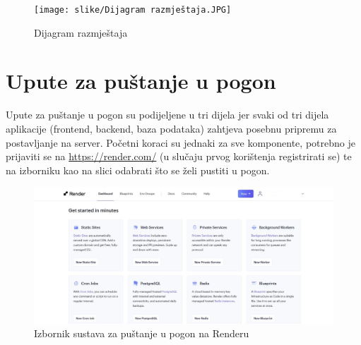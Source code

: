 		\begin{figure}[H]
			\texttt{[image: slike/Dijagram razmještaja.JPG]}
			\centering
			\caption{Dijagram razmještaja}
			\label{fig:Dijagram razmještaja}
		\end{figure}
		\eject 
		
		\section{Upute za puštanje u pogon}
		
		
			Upute za puštanje u pogon su podijeljene u tri dijela jer svaki od tri dijela aplikacije (frontend, backend, baza podataka) zahtjeva posebnu pripremu za postavljanje na server.
			Početni koraci su jednaki za sve komponente, potrebno je prijaviti se na \url{https://render.com/} (u slučaju prvog korištenja registrirati se) te na izborniku kao na slici odabrati što se želi pustiti u pogon.
			\begin{figure}[H]
				\includegraphics[width=\linewidth]{slike/RenderIzbornik.JPG}
				\centering
				\caption{Izbornik sustava za puštanje u pogon na Renderu}
				\label{fig:Izbornik Render}
			\end{figure}
